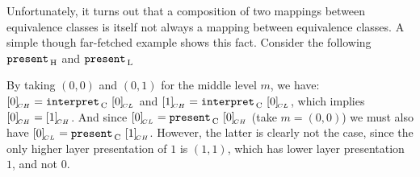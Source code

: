 Unfortunately, it turns out that a composition of two mappings between equivalence classes is itself not always a mapping between equivalence classes.  A simple though far-fetched example shows this fact. Consider the following ${\tt present}_{\, \mathrm H}$ and ${\tt present}_{\, \mathrm L}$






By taking $(0,0)$ and $(0,1)$ for the middle level $m$, we have: $[{0}]_{{\!_{CH}}} = {\tt interpret}_{\, \mathrm C}~[{0}]_{{\!_{CL}}}$ and $[{1}]_{{\!_{CH}}} = {\tt interpret}_{\, \mathrm C}~[{0}]_{{\!_{CL}}}$, which implies $[{0}]_{{\!_{CH}}} = [{1}]_{{\!_{CH}}}$. And since  $[{0}]_{{\!_{CL}}} = {\tt present}_{\, \mathrm C}~[{0}]_{{\!_{CH}}}$ (take $m = (0,0)$) we must also have $[{0}]_{{\!_{CL}}} = {\tt present}_{\, \mathrm C}~[{1}]_{{\!_{CH}}}$. However, the latter is clearly not the case, since the only higher layer presentation of $1$ is $(1,1)$, which has lower layer presentation $1$, and not $0$.




